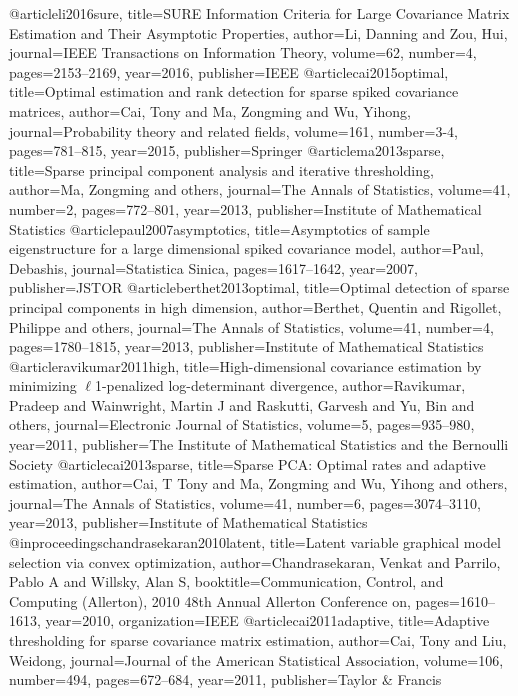 @article{li2016sure,
  title={SURE Information Criteria for Large Covariance Matrix Estimation and Their Asymptotic Properties},
  author={Li, Danning and Zou, Hui},
  journal={IEEE Transactions on Information Theory},
  volume={62},
  number={4},
  pages={2153--2169},
  year={2016},
  publisher={IEEE}
}
@article{cai2015optimal,
  title={Optimal estimation and rank detection for sparse spiked covariance matrices},
  author={Cai, Tony and Ma, Zongming and Wu, Yihong},
  journal={Probability theory and related fields},
  volume={161},
  number={3-4},
  pages={781--815},
  year={2015},
  publisher={Springer}
}
@article{ma2013sparse,
  title={Sparse principal component analysis and iterative thresholding},
  author={Ma, Zongming and others},
  journal={The Annals of Statistics},
  volume={41},
  number={2},
  pages={772--801},
  year={2013},
  publisher={Institute of Mathematical Statistics}
}
@article{paul2007asymptotics,
  title={Asymptotics of sample eigenstructure for a large dimensional spiked covariance model},
  author={Paul, Debashis},
  journal={Statistica Sinica},
  pages={1617--1642},
  year={2007},
  publisher={JSTOR}
}
@article{berthet2013optimal,
  title={Optimal detection of sparse principal components in high dimension},
  author={Berthet, Quentin and Rigollet, Philippe and others},
  journal={The Annals of Statistics},
  volume={41},
  number={4},
  pages={1780--1815},
  year={2013},
  publisher={Institute of Mathematical Statistics}
}@article{ravikumar2011high,
  title={High-dimensional covariance estimation by minimizing $\ell$1-penalized log-determinant divergence},
  author={Ravikumar, Pradeep and Wainwright, Martin J and Raskutti, Garvesh and Yu, Bin and others},
  journal={Electronic Journal of Statistics},
  volume={5},
  pages={935--980},
  year={2011},
  publisher={The Institute of Mathematical Statistics and the Bernoulli Society}
}
@article{cai2013sparse,
  title={Sparse PCA: Optimal rates and adaptive estimation},
  author={Cai, T Tony and Ma, Zongming and Wu, Yihong and others},
  journal={The Annals of Statistics},
  volume={41},
  number={6},
  pages={3074--3110},
  year={2013},
  publisher={Institute of Mathematical Statistics}
}
@inproceedings{chandrasekaran2010latent,
  title={Latent variable graphical model selection via convex optimization},
  author={Chandrasekaran, Venkat and Parrilo, Pablo A and Willsky, Alan S},
  booktitle={Communication, Control, and Computing (Allerton), 2010 48th Annual Allerton Conference on},
  pages={1610--1613},
  year={2010},
  organization={IEEE}
}
@article{cai2011adaptive,
  title={Adaptive thresholding for sparse covariance matrix estimation},
  author={Cai, Tony and Liu, Weidong},
  journal={Journal of the American Statistical Association},
  volume={106},
  number={494},
  pages={672--684},
  year={2011},
  publisher={Taylor \& Francis}
}
